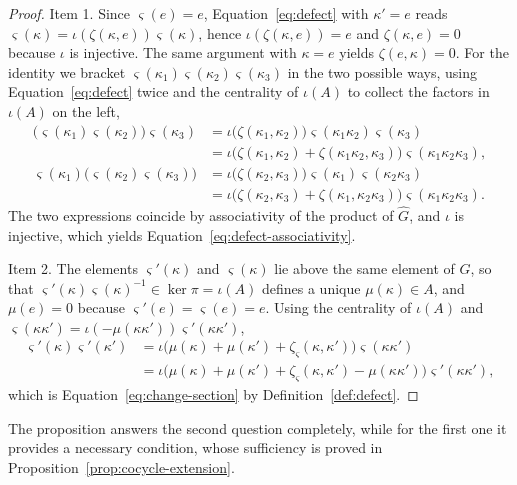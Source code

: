 \begin{proof}
	Item 1. Since $\varsigma(e)=e$, Equation~\eqref{eq:defect} with $\kappa'=e$ reads $\varsigma(\kappa)=\iota(\zeta(\kappa,e))\varsigma(\kappa)$, hence $\iota(\zeta(\kappa,e))=e$ and $\zeta(\kappa,e)=0$ because $\iota$ is injective. The same argument with $\kappa=e$ yields $\zeta(e,\kappa)=0$. For the identity we bracket $\varsigma(\kappa_1)\varsigma(\kappa_2)\varsigma(\kappa_3)$ in the two possible ways, using Equation~\eqref{eq:defect} twice and the centrality of $\iota(A)$ to collect the factors in $\iota(A)$ on the left,
	\begin{align*}
		\big(\varsigma(\kappa_1)\varsigma(\kappa_2)\big)\varsigma(\kappa_3)&=\iota\big(\zeta(\kappa_1,\kappa_2)\big)\varsigma(\kappa_1\kappa_2)\varsigma(\kappa_3)\\
		&=\iota\big(\zeta(\kappa_1,\kappa_2)+\zeta(\kappa_1\kappa_2,\kappa_3)\big)\varsigma(\kappa_1\kappa_2\kappa_3),\\
		\varsigma(\kappa_1)\big(\varsigma(\kappa_2)\varsigma(\kappa_3)\big)&=\iota\big(\zeta(\kappa_2,\kappa_3)\big)\varsigma(\kappa_1)\varsigma(\kappa_2\kappa_3)\\
		&=\iota\big(\zeta(\kappa_2,\kappa_3)+\zeta(\kappa_1,\kappa_2\kappa_3)\big)\varsigma(\kappa_1\kappa_2\kappa_3).
	\end{align*}
	The two expressions coincide by associativity of the product of $\widehat{G}$, and $\iota$ is injective, which yields Equation~\eqref{eq:defect-associativity}.
	
	Item 2. The elements $\varsigma'(\kappa)$ and $\varsigma(\kappa)$ lie above the same element of $G$, so that $\varsigma'(\kappa)\varsigma(\kappa)^{-1}\in\ker\pi=\iota(A)$ defines a unique $\mu(\kappa)\in A$, and $\mu(e)=0$ because $\varsigma'(e)=\varsigma(e)=e$. Using the centrality of $\iota(A)$ and $\varsigma(\kappa\kappa')=\iota(-\mu(\kappa\kappa'))\varsigma'(\kappa\kappa')$,
	\begin{align*}
		\varsigma'(\kappa)\varsigma'(\kappa')&=\iota\big(\mu(\kappa)+\mu(\kappa')+\zeta_\varsigma(\kappa,\kappa')\big)\varsigma(\kappa\kappa')\\
		&=\iota\big(\mu(\kappa)+\mu(\kappa')+\zeta_\varsigma(\kappa,\kappa')-\mu(\kappa\kappa')\big)\varsigma'(\kappa\kappa'),
	\end{align*}
	which is Equation~\eqref{eq:change-section} by Definition~\ref{def:defect}.
\end{proof}

\noindent The proposition answers the second question completely, while for the first one it provides a necessary condition, whose sufficiency is proved in Proposition~\ref{prop:cocycle-extension}.

